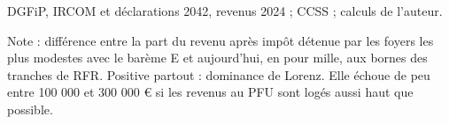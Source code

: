 DGFiP, IRCOM et déclarations 2042, revenus 2024 ; CCSS ; calculs de l'auteur.\par Note : différence entre la part du revenu après impôt détenue par les foyers les plus modestes avec le barème E et aujourd'hui, en pour mille, aux bornes des tranches de RFR. Positive partout : dominance de Lorenz. Elle échoue de peu entre 100 000 et 300 000 \euro{} si les revenus au PFU sont logés aussi haut que possible.
